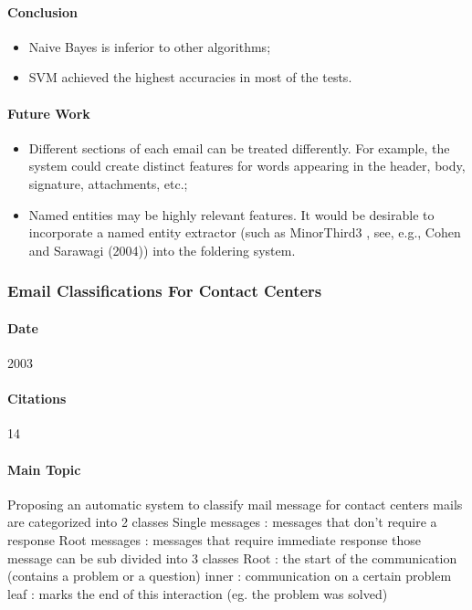 \documentclass[12pt]{article}
\begin{document}
\paragraph{Conclusion}
\begin{itemize}
    \item Naive Bayes is inferior to other algorithms;
    \item SVM achieved the highest accuracies in most of the tests.
\end{itemize}

\paragraph{Future Work}
\begin{itemize}
    \item Different sections of each email can be treated differently. For example, the system could create distinct features for words appearing in the header, body, signature, attachments, etc.;
    \item Named entities may be highly relevant features. It would be desirable to incorporate a named entity extractor (such as MinorThird3 , see, e.g., Cohen and Sarawagi (2004)) into the foldering system.
\end{itemize}





\subsubsection{Email Classifications For Contact Centers}
\paragraph{Date} 2003
\paragraph{Citations} 14
\paragraph{Main Topic}
Proposing an automatic system to classify mail message for contact centers
mails are categorized into 2 classes
Single messages : messages that don’t require a response
Root messages : messages that require immediate response
those message can be sub divided into 3 classes
Root : the start of the communication (contains a problem or a question)
inner : communication on a certain problem
leaf : marks the end of this interaction (eg. the problem was solved)
\end{document}
